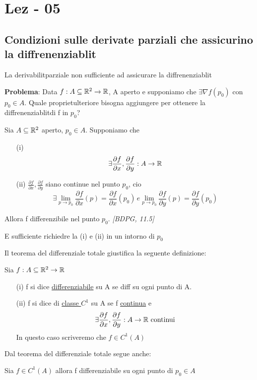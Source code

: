 \section{Lez - 05}
\subsection{Condizioni sulle derivate parziali che assicurino la diffrenenziablit\aca}
\begin{osservazione}
  La derivabilit\aca parziale non \ace sufficiente ad assicurare la diffrenenziablit\aca
\end{osservazione}
\textbf{Problema}: Data $f: A \subseteq \mathbb{R}^2 \to \mathbb{R}$, A aperto e supponiamo che $\exists\nabla f(p_0)$ con $p_0\in A$.
Quale propriet\aca ulteriore bisogna aggiungere per ottenere la diffrenenziablit\aca di f in $p_0$?
\begin{theorem}
  Sia $A\subseteq \mathbb{R}^2$ aperto, $p_0\in A$. Supponiamo che 
  \begin{enumerate}
    \item[(i)] $$\exists \frac{\partial f}{\partial x} , \frac{\partial f}{\partial y} : A \to \mathbb{R}$$
    \item[(ii)] $\frac{\partial f}{\partial x}, \frac{\partial f}{\partial y}$ siano continue nel 
              punto $p_0$, cio\ace $$\exists \lim_{p\to p_0} \frac{\partial f}{\partial x} (p) = \frac{\partial f}{\partial x} (p_0) \,
              e \lim_{p\to p_0} \frac{\partial f}{\partial y} (p) = \frac{\partial f}{\partial y} (p_0)$$
  \end{enumerate}
  Allora f \ace differenzibile nel punto $p_0$. \textit{[BDPG, 11.5]}
\end{theorem}
\begin{osservazione}
  \ac{E} sufficiente richiedre la (i) e (ii) in un intorno di $p_0$
\end{osservazione}
Il teorema del differenziale totale giustifica la seguente definizione:
\begin{definition}
  Sia $f: A \subseteq \mathbb{R}^2 \to \mathbb{R}$
  \begin{enumerate}
    \item[(i)] f si dice \underline{differenziabile} su A se \ace diff su ogni punto di A.
    \item[(ii)] f si dice di \underline{classe $C^1$} su A se f \ace \underline{continua} e 
          $$\exists \frac{\partial f}{\partial x}, \frac{\partial f}{\partial y} : A \to \mathbb{R} \text{ continui}$$ 
          In questo caso scriveremo che $f \in C^1(A)$
  \end{enumerate}
\end{definition}
Dal teorema del differenziale totale segue anche:
\begin{corollary}
  Sia $f\in C^1(A)$ allora f \ace differenziabile su ogni punto di $p_0 \in A$
\end{corollary}
